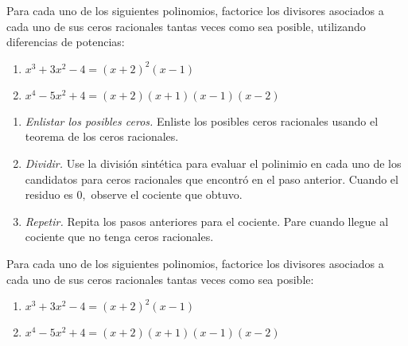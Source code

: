
	\begin{problema} Para cada uno de los siguientes polinomios, factorice los divisores asociados a cada uno de sus ceros racionales tantas veces como sea posible, utilizando diferencias de potencias:
		
		\begin{enumerate}
			\item $x^{3}+3x^{2}-4={\left(x + 2\right)}^{2} {\left(x - 1\right)}
			$
			\item $x^{4}-5x^{2}+4={\left(x + 2\right)} {\left(x + 1\right)} {\left(x - 1\right)} {\left(x - 2\right)}
			$
		\end{enumerate}
		
		
	\end{problema}


	\begin{alg}
		\begin{enumerate}
			\item \emph{Enlistar los posibles ceros.} Enliste los posibles ceros racionales usando el teorema de los ceros racionales.
			\item \emph{Dividir.} Use la divisi\'on sint\'etica para evaluar el polinimio en cada uno de los candidatos para ceros racionales que encontr\'o en el paso anterior. Cuando el residuo es $0,$ observe el cociente que obtuvo.
			\item \emph{Repetir.} Repita los pasos anteriores para el cociente. Pare cuando llegue al cociente que no tenga ceros racionales.
		\end{enumerate}
		
	\end{alg}



	\begin{problema} Para cada uno de los siguientes polinomios, factorice los divisores asociados a cada uno de sus ceros racionales tantas veces como sea posible:
		
		\begin{enumerate}
			\item $x^{3}+3x^{2}-4={\left(x + 2\right)}^{2} {\left(x - 1\right)}
			$
			\item $x^{4}-5x^{2}+4={\left(x + 2\right)} {\left(x + 1\right)} {\left(x - 1\right)} {\left(x - 2\right)}
			$
		\end{enumerate}
		
		
	\end{problema}


